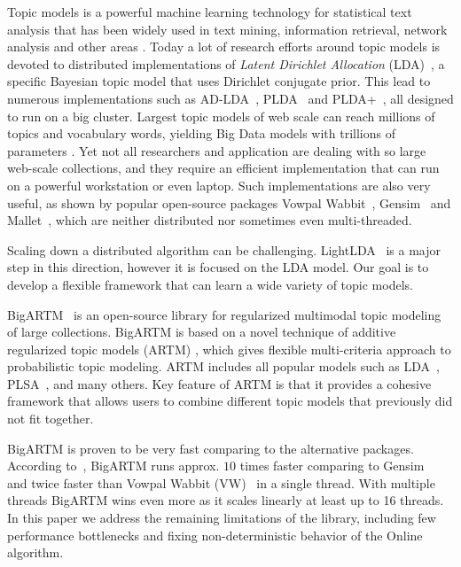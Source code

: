 \documentclass[russian,english]{llncs}
\begin{document}
Topic models \cite{blei12ptm} is a powerful machine learning technology for statistical text analysis
that has been widely used in text mining, information retrieval, network analysis and other areas \cite{daud10knowledge}.
Today a lot of research efforts around topic models is devoted to distributed implementations of
\emph{Latent Dirichlet Allocation} (LDA)~\cite{blei03latent},
a specific Bayesian topic model that uses Dirichlet conjugate prior.
This lead to numerous implementations such as
AD-LDA~\cite{newman09distributed}, PLDA~\cite{wang09plda} and PLDA{+}~\cite{liu11plda},
all designed to run on a big cluster.
Largest topic models of web scale can reach millions of topics and vocabulary words, 
yielding Big Data models with trillions of parameters \cite{yuan15lightlda}.
Yet not all researchers and application are dealing with so large web-scale collections,
and they require an efficient implementation that can run on a powerful workstation or even laptop.
Such implementations are also very useful,
as shown by popular open-source packages
Vowpal Wabbit~\cite{langford07vw}, Gensim~\cite{rehurek10software} and Mallet~\cite{McCallum02mallet},
which are neither distributed nor sometimes even multi-threaded.

Scaling down a distributed algorithm can be challenging.
LightLDA~\cite{yuan15lightlda} is a major step in this direction,
however it is focused on the LDA model.
Our goal is to develop a flexible framework that can learn a wide variety of topic models.

BigARTM~\cite{vfardi15aist} is an open-source library for
regularized multimodal topic modeling of large collections.
BigARTM is based on a novel technique of additive regularized topic models (ARTM) \cite{voron14dan-eng,voron14mlj,voron14aist},
which gives flexible multi-criteria approach to probabilistic topic modeling.
ARTM includes all popular models such as 
LDA~\cite{blei03latent}, 
PLSA~\cite{hofmann99plsi},
and many others.
Key feature of ARTM is that it provides a cohesive framework that allows users to combine
different topic models that previously did not fit together.

BigARTM is proven to be very fast comparing to the alternative packages.
According to~\cite{vfardi15aist}, BigARTM
runs approx. $10$ times faster comparing to Gensim~\cite{rehurek10software}
and twice faster than
Vowpal Wabbit (VW)~\cite{langford07vw}
in a single thread.
With multiple threads BigARTM wins even more
as it scales linearly at least up to 16 threads.
In this paper we address the remaining limitations of the library,
including few performance bottlenecks
and fixing non-deterministic behavior of the Online algorithm.
\end{document}
